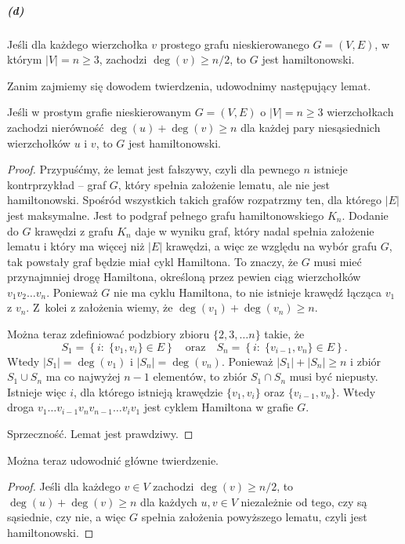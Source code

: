 \subparagraph{(d)}
\begin{twierdzenie*}[Dirac]
	Jeśli dla każdego wierzchołka $v$ prostego grafu nieskierowanego $G=(V,E)$, w którym $|V|=n\ge 3$, zachodzi $\deg(v)\ge n/2$, to $G$ jest hamiltonowski.
\end{twierdzenie*}
Zanim zajmiemy się dowodem twierdzenia, udowodnimy następujący lemat.
\begin{lemat*}[Ore]
	Jeśli w prostym grafie nieskierowanym $G=(V,E)$ o $|V|=n\ge 3$ wierzchołkach zachodzi nierówność $\deg(u)+\deg(v)\ge n$ dla każdej pary niesąsiednich wierzchołków $u$ i $v$, to $G$ jest hamiltonowski.
\end{lemat*}
\begin{proof}
Przypuśćmy, że lemat jest fałszywy, czyli dla pewnego $n$ istnieje kontrprzykład -- graf $G$, który spełnia założenie lematu, ale nie jest hamiltonowski. Spośród wszystkich takich grafów rozpatrzmy ten, dla którego $|E|$ jest maksymalne. Jest to podgraf pełnego grafu hamiltonowskiego $K_n$. Dodanie do $G$ krawędzi z grafu $K_n$ daje w wyniku graf, który nadal spełnia założenie lematu i który ma więcej niż $|E|$ krawędzi, a więc ze względu na wybór grafu $G$, tak powstały graf będzie miał cykl Hamiltona. To znaczy, że $G$ musi mieć przynajmniej drogę Hamiltona, określoną przez pewien ciąg wierzchołków $v_1v_2\dots v_n$. Ponieważ $G$ nie ma cyklu Hamiltona, to nie istnieje krawędź łącząca $v_1$ z $v_n$. Z~kolei z założenia wiemy, że $\deg(v_1)+\deg(v_n)\ge n$.

Można teraz zdefiniować podzbiory zbioru $\{2,3,\dots n\}$ takie, że
\[
	S_1 = \left\{ i:\;\{ v_1,v_i\}\in E\right\}\quad\mbox{oraz}\quad S_n = \left\{ i:\;\{ v_{i-1},v_n\}\in E\right\}.
\]
Wtedy $|S_1|=\deg(v_1)$ i $|S_n|=\deg(v_n)$. Ponieważ $|S_1|+|S_n|\ge n$ i zbiór $S_1\cup S_n$ ma co najwyżej $n-1$ elementów, to zbiór $S_1\cap S_n$ musi być niepusty. Istnieje więc $i$, dla którego istnieją krawędzie $\{ v_1,v_i\}$ oraz $\{ v_{i-1},v_n\}$. Wtedy droga $v_1\dots v_{i-1}v_nv_{n-1}\dots v_iv_1$ jest cyklem Hamiltona w grafie $G$.

Sprzeczność. Lemat jest prawdziwy.
\end{proof}

Można teraz udowodnić główne twierdzenie.
\begin{proof}
Jeśli dla każdego $v\in V$ zachodzi $\deg(v)\ge n/2$, to $\deg(u)+\deg(v)\ge n$ dla każdych $u,v\in V$ niezależnie od tego, czy są sąsiednie, czy nie, a więc $G$ spełnia założenia powyższego lematu, czyli jest hamiltonowski.
\end{proof}

